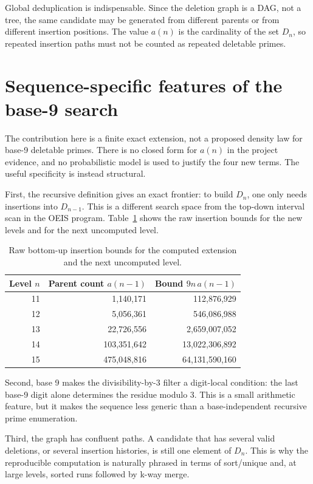 \documentclass[11pt]{article}
\theoremstyle{definition}
\theoremstyle{remark}
\begin{document}
Global deduplication is indispensable.  Since the deletion graph is a DAG,
not a tree, the same candidate may be generated from different parents or
from different insertion positions.  The value \(a(n)\) is the cardinality of
the set \(D_n\), so repeated insertion paths must not be counted as repeated
deletable primes.

\section{Sequence-specific features of the base-9 search}
\label{sec:specificity}

The contribution here is a finite exact extension, not a proposed density
law for base-9 deletable primes.  There is no closed form for \(a(n)\) in
the project evidence, and no probabilistic model is used to justify the four
new terms.  The useful specificity is instead structural.

First, the recursive definition gives an exact frontier: to build \(D_n\),
one only needs insertions into \(D_{n-1}\).  This is a different search
space from the top-down interval scan in the OEIS program.  Table~\ref{tab:bounds}
shows the raw insertion bounds for the new levels and for the next
uncomputed level.

\begin{table}[ht]
\centering
\begin{tabular}{r r r}
\toprule
Level \(n\) & Parent count \(a(n-1)\) & Bound \(9n\,a(n-1)\)\\
\midrule
11 & 1,140,171 & 112,876,929\\
12 & 5,056,361 & 546,086,988\\
13 & 22,726,556 & 2,659,007,052\\
14 & 103,351,642 & 13,022,306,892\\
15 & 475,048,816 & 64,131,590,160\\
\bottomrule
\end{tabular}
\caption{Raw bottom-up insertion bounds for the computed extension and the
next uncomputed level.}
\label{tab:bounds}
\end{table}

Second, base 9 makes the divisibility-by-\(3\) filter a digit-local
condition: the last base-9 digit alone determines the residue modulo \(3\).
This is a small arithmetic feature, but it makes the sequence less generic
than a base-independent recursive prime enumeration.

Third, the graph has confluent paths.  A candidate that has several valid
deletions, or several insertion histories, is still one element of \(D_n\).
This is why the reproducible computation is naturally phrased in terms of
sort/unique and, at large levels, sorted runs followed by k-way merge.
\end{document}
